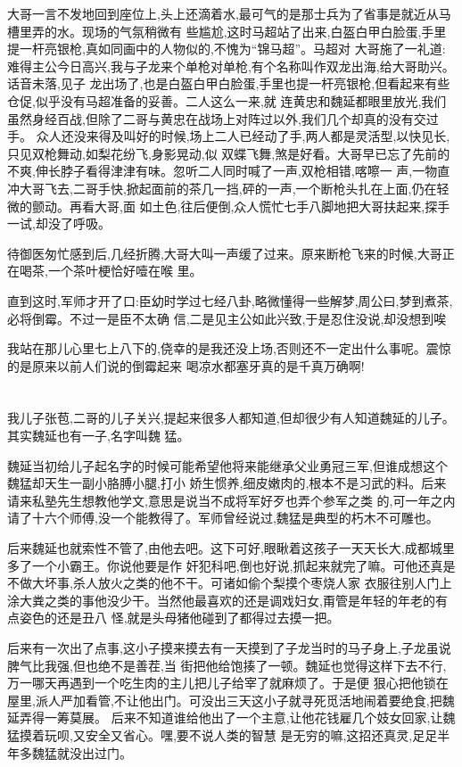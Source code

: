 ﻿\documentclass[12pt,twocolumn]{article}
\begin{document}
大哥一言不发地回到座位上,头上还滴着水,最可气的是那士兵为了省事是就近从马槽里弄的水。现场的气氛稍微有
些尴尬,这时马超站了出来,白盔白甲白脸蛋,手里提一杆亮银枪,真如同画中的人物似的,不愧为``锦马超''。马超对
大哥施了一礼道:难得主公今日高兴,我与子龙来个单枪对单枪,有个名称叫作双龙出海,给大哥助兴。话音未落,见子
龙出场了,也是白盔白甲白脸蛋,手里也提一杆亮银枪,但看起来有些仓促,似乎没有马超准备的妥善。二人这么一来,就
连黄忠和魏延都眼里放光,我们虽然身经百战,但除了二哥与黄忠在战场上对阵过以外,我们几个却真的没有交过手。
众人还没来得及叫好的时候,场上二人已经动了手,两人都是灵活型,以快见长,只见双枪舞动,如梨花纷飞,身影晃动,似
双蝶飞舞,煞是好看。大哥早已忘了先前的不爽,伸长脖子看得津津有味。忽听二人同时喊了一声,双枪相错,喀嚓一
声,一物直冲大哥飞去,二哥手快,掀起面前的茶几一挡,砰的一声,一个断枪头扎在上面,仍在轻微的颤动。再看大哥,面
如土色,往后便倒,众人慌忙七手八脚地把大哥扶起来,探手一试,却没了呼吸。

待御医匆忙感到后,几经折腾,大哥大叫一声缓了过来。原来断枪飞来的时候,大哥正在喝茶,一个茶叶梗恰好噎在喉
里。

直到这时,军师才开了口:臣幼时学过七经八卦,略微懂得一些解梦,周公曰,梦到煮茶,必将倒霉。不过一是臣不太确
信,二是见主公如此兴致,于是忍住没说,却没想到\dldots 唉\dldots

我站在那儿心里七上八下的,侥幸的是我还没上场,否则还不一定出什么事呢。震惊的是原来以前人们说的倒霉起来
喝凉水都塞牙真的是千真万确啊! 

\section{}

我儿子张苞,二哥的儿子关兴,提起来很多人都知道,但却很少有人知道魏延的儿子。其实魏延也有一子,名字叫魏
猛。

魏延当初给儿子起名字的时候可能希望他将来能继承父业勇冠三军,但谁成想这个魏猛却天生一副小胳膊小腿,打小
娇生惯养,细皮嫩肉的,根本不是习武的料。后来请来私塾先生想教他学文,意思是说当不成将军好歹也弄个参军之类
的,可一年之内请了十六个师傅,没一个能教得了。军师曾经说过,魏猛是典型的朽木不可雕也。

后来魏延也就索性不管了,由他去吧。这下可好,眼瞅着这孩子一天天长大,成都城里多了一个小霸王。你说他要是作
奸犯科吧,倒也好说,抓起来就完了嘛。可他还真是不做大坏事,杀人放火之类的他不干。可诸如偷个梨摸个枣烧人家
衣服往别人门上涂大粪之类的事他没少干。当然他最喜欢的还是调戏妇女,甭管是年轻的年老的有点姿色的还是丑八
怪,就是头母猪他碰到了都得过去摸一把。

后来有一次出了点事,这小子摸来摸去有一天摸到了子龙当时的马子身上,子龙虽说脾气比我强,但也绝不是善茬,当
街把他给饱揍了一顿。魏延也觉得这样下去不行,万一哪天再遇到一个吃生肉的主儿把儿子给宰了就麻烦了。于是便
狠心把他锁在屋里,派人严加看管,不让他出门。可没出三天这小子就寻死觅活地闹着要绝食,把魏延弄得一筹莫展。
后来不知道谁给他出了一个主意,让他花钱雇几个妓女回家,让魏猛摸着玩呗,又安全又省心。嘿,要不说人类的智慧
是无穷的嘛,这招还真灵,足足半年多魏猛就没出过门。
\end{document}
